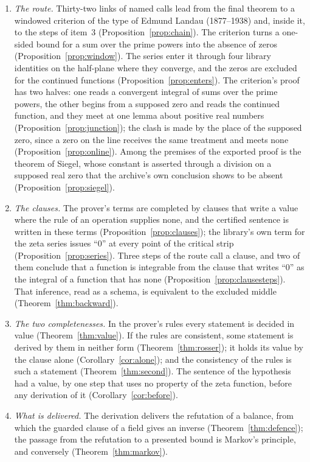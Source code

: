 \documentclass[11pt]{article}
\theoremstyle{definition}
\theoremstyle{remark}
\begin{document}
\begin{enumerate}[leftmargin=2em,itemsep=2pt]
\item \emph{The route.} Thirty-two links of named calls lead from the final theorem to a windowed criterion of the type of Edmund Landau (1877--1938) and, inside it, to the steps of item~3 (Proposition~\ref{prop:chain}). The criterion turns a one-sided bound for a sum over the prime powers into the absence of zeros (Proposition~\ref{prop:window}). The series enter it through four library identities on the half-plane where they converge, and the zeros are excluded for the continued functions (Proposition~\ref{prop:enters}). The criterion's proof has two halves: one reads a convergent integral of sums over the prime powers, the other begins from a supposed zero and reads the continued function, and they meet at one lemma about positive real numbers (Proposition~\ref{prop:junction}); the clash is made by the place of the supposed zero, since a zero on the line receives the same treatment and meets none (Proposition~\ref{prop:online}). Among the premises of the exported proof is the theorem of Siegel, whose constant is asserted through a division on a supposed real zero that the archive's own conclusion shows to be absent (Proposition~\ref{prop:siegel}).
\item \emph{The clauses.} The prover's terms are completed by clauses that write a value where the rule of an operation supplies none, and the certified sentence is written in these terms (Proposition~\ref{prop:clauses}); the library's own term for the zeta series issues ``0'' at every point of the critical strip (Proposition~\ref{prop:series}). Three steps of the route call a clause, and two of them conclude that a function is integrable from the clause that writes ``0'' as the integral of a function that has none (Proposition~\ref{prop:clausesteps}). That inference, read as a schema, is equivalent to the excluded middle (Theorem~\ref{thm:backward}).
\item \emph{The two completenesses.} In the prover's rules every statement is decided in value (Theorem~\ref{thm:value}). If the rules are consistent, some statement is derived by them in neither form (Theorem~\ref{thm:rosser}); it holds its value by the clause alone (Corollary~\ref{cor:alone}); and the consistency of the rules is such a statement (Theorem~\ref{thm:second}). The sentence of the hypothesis had a value, by one step that uses no property of the zeta function, before any derivation of it (Corollary~\ref{cor:before}).
\item \emph{What is delivered.} The derivation delivers the refutation of a balance, from which the guarded clause of a field gives an inverse (Theorem~\ref{thm:defence}); the passage from the refutation to a presented bound is Markov's principle, and conversely (Theorem~\ref{thm:markov}).

\end{enumerate}
\end{document}
